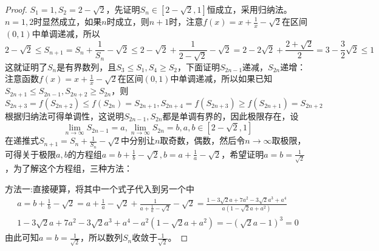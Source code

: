 \documentclass[../../main.tex]{subfiles}%
\begin{document}
\begin{proof}

\(S_1 = 1,S_2 = 2-\sqrt{2}\)，先证明\(S_n\in[2 - \sqrt{2},1]\)恒成立，采用归纳法。
\(n = 1,2\)时显然成立，如果\(n\)时成立，则\(n + 1\)时，注意\(f(x)=x+\frac{1}{x}-\sqrt{2}\)在区间\((0,1)\)中单调递减，所以
\[2-\sqrt{2}\leqslant  S_{n + 1}=S_n+\frac{1}{S_n}-\sqrt{2}\leqslant 2-\sqrt{2}+\frac{1}{2 - \sqrt{2}}-\sqrt{2}=2-2\sqrt{2}+\frac{2+\sqrt{2}}{2}=3-\frac{3}{2}\sqrt{2}\leqslant 1\]
这就证明了\(S_n\)是有界数列，且\(S_3\leqslant  S_1,S_4\geqslant  S_2\)，下面证明\(S_{2n - 1}\)递减，\(S_{2n}\)递增：
注意函数\(f(x)=x+\frac{1}{x}-\sqrt{2}\)在区间\((0,1)\)中单调递减，所以如果已知\(S_{2n + 1}\leqslant  S_{2n - 1},S_{2n + 2}\geqslant  S_{2n}\)，则
\[S_{2n + 3}=f(S_{2n + 2})\leqslant  f(S_{2n})=S_{2n + 1},S_{2n + 4}=f(S_{2n + 3})\geqslant  f(S_{2n + 1})=S_{2n + 2}\]
根据归纳法可得单调性，这说明\(S_{2n - 1},S_{2n}\)都是单调有界的，因此极限存在，设
\[\lim_{n\rightarrow\infty}S_{2n - 1}=a,\lim_{n\rightarrow\infty}S_{2n}=b,a,b\in[2 - \sqrt{2},1]\]
在递推式\(S_{n + 1}=S_n+\frac{1}{S_n}-\sqrt{2}\)中分别让\(n\)取奇数，偶数，然后令\(n\rightarrow\infty\)取极限，可得关于极限\(a,b\)的方程组\(a = b+\frac{1}{b}-\sqrt{2},b = a+\frac{1}{a}-\sqrt{2}\)，希望证明\(a = b=\frac{1}{\sqrt{2}}\)，为了解这个方程组，三种方法：

{\color{blue}方法一:}直接硬算，将其中一个式子代入到另一个中
\begin{align*}
a=b+\frac{1}{b}-\sqrt{2}=a+\frac{1}{a}-\sqrt{2}+\frac{1}{a+\frac{1}{a}-\sqrt{2}}-\sqrt{2}=\frac{1 - 3\sqrt{2}a + 7a^2-3\sqrt{2}a^3 + a^4}{a(1-\sqrt{2}a + a^2)}\\
1 - 3\sqrt{2}a + 7a^2-3\sqrt{2}a^3 + a^4-a^2(1-\sqrt{2}a + a^2)=-\left(\sqrt{2}a - 1\right)^3=0
\end{align*}
由此可知\(a = b=\frac{1}{\sqrt{2}}\)，所以数列\(S_n\)收敛于\(\frac{1}{\sqrt{2}}\)。


\end{proof}
\end{document}
